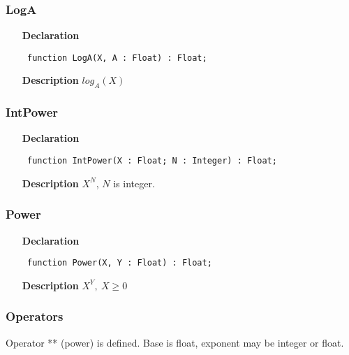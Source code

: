 \documentclass[12pt,a4paper,oneside]{report}
\newcommand{\lmath}[1]{   %
	\marginpar{\vspace{#1} 
		\begin{flushright}
			LMath
	\end{flushright} }
}
\newcommand{\declarationitem}[1]{\textbf{#1}}
\newcommand{\descriptiontitle}[1]{\textbf{#1}}
\newcommand{\code}[1]{\texttt{#1}}
\begin{document}
\subsubsection{LogA}
\label{umath-LogA}
\begin{itemize}\item[\declarationitem{Declaration}\hfill]
	\begin{flushleft}
		\code{
			function LogA(X, A : Float) : Float;}
		
	\end{flushleft}
	
	\par
	\item[\descriptiontitle{Description}]
	$log_A(X)$
	
\end{itemize}
\subsubsection{IntPower}
\label{umath-IntPower}
\begin{itemize}\item[\declarationitem{Declaration}\hfill]
	\begin{flushleft}
		\code{
			function IntPower(X : Float; N : Integer) : Float;}
		
	\end{flushleft}
	
	\par
	\item[\descriptiontitle{Description}]
	$X^N$, $N$ is integer.
	
\end{itemize}
\subsubsection{Power}
\label{umath-Power}
\begin{itemize}\item[\declarationitem{Declaration}\hfill]
	\begin{flushleft}
		\code{
			function Power(X, Y : Float) : Float;}
		
	\end{flushleft}
	
	\par
	\item[\descriptiontitle{Description}]
	$X^Y,\ X\ge 0$
	
\end{itemize}
\subsubsection{Operators}
Operator ** (power) is defined. Base is float, exponent may be integer or float. \lmath{-12pt}
\end{document}
